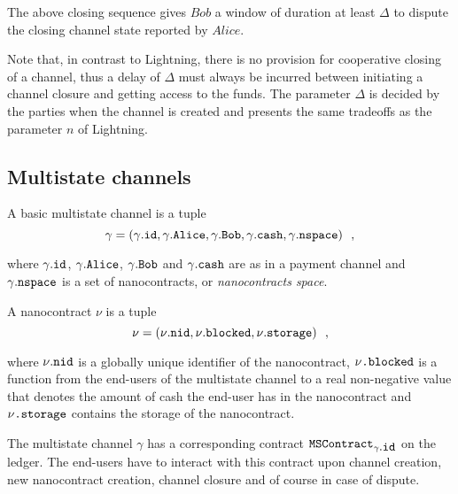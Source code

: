    The above closing sequence gives $Bob$ a window of duration at least $\Delta$ to
    dispute the closing channel state reported by $Alice$.

    Note that, in contrast to Lightning, there is no provision for cooperative closing of
    a channel, thus a delay of $\Delta$ must always be incurred between initiating a
    channel closure and getting access to the funds. The parameter $\Delta$ is decided by
    the parties when the channel is created and presents the same tradeoffs as the
    parameter $n$ of Lightning.

  \subsection{Multistate channels}
    A basic multistate channel is a tuple
    \begin{equation*}
      \gamma = \left(\gamma\mbox{.\texttt{id}}, \gamma\mbox{.\texttt{Alice}},
      \gamma\mbox{.\texttt{Bob}}, \gamma\mbox{.\texttt{cash}},
      \gamma\mbox{.\texttt{nspace}}\right) \enspace,
    \end{equation*}

    where $\gamma\mbox{.\texttt{id}}$, $\gamma\mbox{.\texttt{Alice}}$,
    $\gamma\mbox{.\texttt{Bob}}$ and $\gamma\mbox{.\texttt{cash}}$ are as in a payment
    channel and $\gamma\mbox{.\texttt{nspace}}$ is a set of nanocontracts, or
    \textit{nanocontracts space}.

    A nanocontract $\nu$ is a tuple
    \begin{equation*}
      \nu = \left(\nu\mbox{.\texttt{nid}}, \nu\mbox{.\texttt{blocked}},
      \nu\mbox{.\texttt{storage}}\right) \enspace,
    \end{equation*}

    where $\nu\mbox{.\texttt{nid}}$ is a globally unique identifier of the nanocontract,
    $\nu\mbox{\texttt{.blocked}}$ is a function from the end-users of the multistate
    channel to a real non-negative value that denotes the amount of cash the end-user has
    in the nanocontract and $\nu\mbox{\texttt{.storage}}$ contains the storage of the
    nanocontract.

    The multistate channel $\gamma$ has a corresponding contract
    $\mbox{\texttt{MSContract}}_{\gamma\mbox{.\texttt{id}}}$ on the ledger. The end-users
    have to interact with this contract upon channel creation, new nanocontract creation,
    channel closure and of course in case of dispute.
